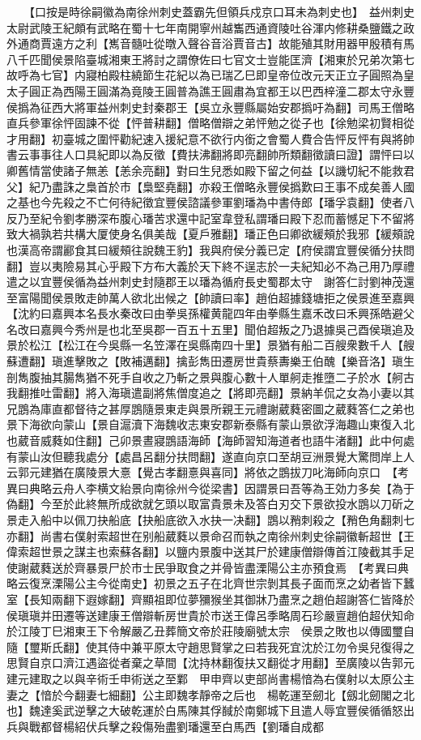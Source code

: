 　　【口按是時徐嗣徽為南徐州刺史蓋霸先但領兵戍京口耳未為刺史也】　益州刺史太尉武陵王紀頗有武略在蜀十七年南開寧州越雟西通資陵吐谷渾内修耕桑鹽鐵之政外通商賈遠方之利【嶲音髓吐從暾入聲谷音浴賈音古】故能殖其財用器甲殷積有馬八千匹聞侯景陷臺城湘東王將討之謂僚佐曰七官文士豈能匡濟【湘東於兄弟次第七故呼為七官】内寢柏殿柱繞節生花紀以為已瑞乙巳即皇帝位改元天正立子圓照為皇太子圓正為西陽王圓滿為竟陵王圓普為譙王圓肅為宜都王以巴西梓潼二郡太守永豐侯撝為征西大將軍益州刺史封秦郡王【吳立永豐縣屬始安郡撝吁為翻】司馬王僧略直兵參軍徐怦固諫不從【怦普耕翻】僧略僧辯之弟怦勉之從子也【徐勉梁初賢相從才用翻】初臺城之圍怦勸紀速入援紀意不欲行内銜之會蜀人費合告怦反怦有與將帥書云事事往人口具紀即以為反徵【費扶沸翻將即亮翻帥所類翻徵讀曰證】謂怦曰以卿舊情當使諸子無恙【恙余亮翻】對曰生兒悉如殿下留之何益【以譏切紀不能救君父】紀乃盡誅之梟首於市【梟堅堯翻】亦殺王僧略永豐侯撝歎曰王事不成矣善人國之基也今先殺之不亡何待紀徵宜豐侯諮議參軍劉璠為中書侍郎【璠孚袁翻】使者八反乃至紀令劉孝勝深布腹心璠苦求還中記室韋登私謂璠曰殿下忍而蓄憾足下不留將致大禍孰若共構大厦使身名俱美哉【夏戶雅翻】璠正色曰卿欲緩頰於我邪【緩頰說也漢高帝謂酈食其曰緩頰往說魏王豹】我與府侯分義已定【府侯謂宜豐侯循分扶問翻】豈以夷險易其心乎殿下方布大義於天下終不逞志於一夫紀知必不為己用乃厚禮遣之以宜豐侯循為益州刺史封隨郡王以璠為循府長史蜀郡太守　謝答仁討劉神茂還至富陽聞侯景敗走帥萬人欲北出候之【帥讀曰率】趙伯超據錢塘拒之侯景進至嘉興【沈約曰嘉興本名長水秦改曰由拳吳孫權黄龍四年由拳縣生嘉禾改曰禾興孫皓避父名改曰嘉興今秀州是也北至吳郡一百五十五里】聞伯超叛之乃退據吳己酉侯瑱追及景於松江【松江在今吳縣一名笠澤在吳縣南四十里】景猶有船二百艘衆數千人【艘蘇遭翻】瑱進擊敗之【敗補邁翻】擒彭雋田遷房世貴蔡夀樂王伯醜【樂音洛】瑱生剖雋腹抽其腸雋猶不死手自收之乃斬之景與腹心數十人單舸走推墮二子於水【舸古我翻推吐雷翻】將入海瑱遣副將焦僧度追之【將即亮翻】景納羊侃之女為小妻以其兄鵾為庫直都督待之甚厚鵾隨景東走與景所親王元禮謝葳蕤密圖之葳蕤答仁之弟也景下海欲向蒙山【景自滬瀆下海魏收志東安郡新泰縣有蒙山景欲浮海趣山東復入北也葳音威蕤如住翻】己卯景晝寢鵾語海師【海師習知海道者也語牛渚翻】此中何處有蒙山汝但聽我處分【處昌呂翻分扶問翻】遂直向京口至胡豆洲景覺大驚問岸上人云郭元建猶在廣陵景大憙【覺古孝翻憙與喜同】將依之鵾拔刀叱海師向京口　【考異曰典略云舟人李横文紿景向南徐州今從梁書】因謂景曰吾等為王効力多矣【為于偽翻】今至於此終無所成欲就乞頭以取富貴景未及答白刃交下景欲投水鵾以刀斫之景走入船中以佩刀抉船底【抉船底欲入水抉一决翻】鵾以矟刺殺之【矟色角翻刺七亦翻】尚書右僕射索超世在别船葳蕤以景命召而執之南徐州刺史徐嗣徽斬超世【王偉索超世景之謀主也索蘇各翻】以鹽内景腹中送其尸於建康僧辯傳首江陵截其手足使謝葳蕤送於齊暴景尸於市士民爭取食之并骨皆盡溧陽公主亦預食焉　【考異曰典略云復烹溧陽公主今從南史】初景之五子在北齊世宗剝其長子面而烹之幼者皆下蠶室【長知兩翻下遐嫁翻】齊顯祖即位夢獼猴坐其御牀乃盡烹之趙伯超謝答仁皆降於侯瑱瑱并田遷等送建康王僧辯斬房世貴於市送王偉呂季略周石珍嚴亶趙伯超伏知命於江陵丁巳湘東王下令解嚴乙丑葬簡文帝於莊陵廟號太宗　侯景之敗也以傳國璽自隨【璽斯氏翻】使其侍中兼平原太守趙思賢掌之曰若我死宜沈於江勿令吳兒復得之思賢自京口濟江遇盜從者棄之草間【沈持林翻復扶又翻從才用翻】至廣陵以告郭元建元建取之以與辛術壬申術送之至鄴　甲申齊以吏部尚書楊愔為右僕射以太原公主妻之【愔於今翻妻七細翻】公主即魏孝靜帝之后也　楊乾運至劒北【劔北劒閣之北也】魏達奚武逆擊之大破乾運於白馬陳其俘馘於南鄭城下且遣人辱宜豐侯循循怒出兵與戰都督楊紹伏兵擊之殺傷殆盡劉璠還至白馬西【劉璠自成都